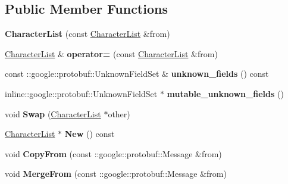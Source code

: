 \subsection*{Public Member Functions}
\begin{DoxyCompactItemize}
\item 
{\bfseries Character\+List} (const \hyperlink{classCharacterList}{Character\+List} \&from)\hypertarget{classCharacterList_a1ed067e662cd53535231d97ebde90f3a}{}\label{classCharacterList_a1ed067e662cd53535231d97ebde90f3a}

\item 
\hyperlink{classCharacterList}{Character\+List} \& {\bfseries operator=} (const \hyperlink{classCharacterList}{Character\+List} \&from)\hypertarget{classCharacterList_a14a699dec984c891b62335324dce44c2}{}\label{classCharacterList_a14a699dec984c891b62335324dce44c2}

\item 
const \+::google\+::protobuf\+::\+Unknown\+Field\+Set \& {\bfseries unknown\+\_\+fields} () const \hypertarget{classCharacterList_a3c3975713049e07f49ecce655f2377b9}{}\label{classCharacterList_a3c3975713049e07f49ecce655f2377b9}

\item 
inline\+::google\+::protobuf\+::\+Unknown\+Field\+Set $\ast$ {\bfseries mutable\+\_\+unknown\+\_\+fields} ()\hypertarget{classCharacterList_ace97f06c2b340df27844b871f48f4f55}{}\label{classCharacterList_ace97f06c2b340df27844b871f48f4f55}

\item 
void {\bfseries Swap} (\hyperlink{classCharacterList}{Character\+List} $\ast$other)\hypertarget{classCharacterList_a09c3d2ac8f7c27358df80ddecdf05d8b}{}\label{classCharacterList_a09c3d2ac8f7c27358df80ddecdf05d8b}

\item 
\hyperlink{classCharacterList}{Character\+List} $\ast$ {\bfseries New} () const \hypertarget{classCharacterList_a02d238f38e24b848dfe937cbb0d338c9}{}\label{classCharacterList_a02d238f38e24b848dfe937cbb0d338c9}

\item 
void {\bfseries Copy\+From} (const \+::google\+::protobuf\+::\+Message \&from)\hypertarget{classCharacterList_a88a9e0cd7ac22adeb6ea757fe794c3e9}{}\label{classCharacterList_a88a9e0cd7ac22adeb6ea757fe794c3e9}

\item 
void {\bfseries Merge\+From} (const \+::google\+::protobuf\+::\+Message \&from)\hypertarget{classCharacterList_a665e578b3b4d25d8d066f0de52ed7f3c}{}\label{classCharacterList_a665e578b3b4d25d8d066f0de52ed7f3c}


\end{DoxyCompactItemize}
